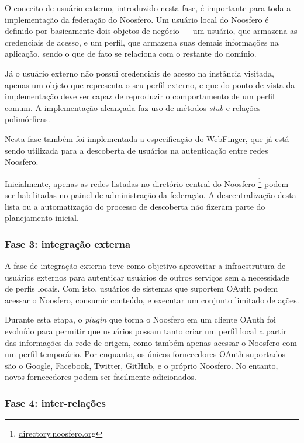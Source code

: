 O conceito de usuário externo, introduzido nesta fase, é importante para toda a
implementação da federação do Noosfero. Um usuário local do Noosfero é definido por
basicamente dois objetos de negócio --- um usuário, que armazena as credenciais de
acesso, e um perfil, que armazena suas demais informações na aplicação, sendo o que
de fato se relaciona com o restante do domínio.

Já o usuário externo não possui credenciais de acesso na instância visitada, apenas
um objeto que representa o seu perfil externo, e que do ponto de vista da
implementação deve ser capaz de reproduzir o comportamento de um perfil comum. A
implementação alcançada faz uso de métodos \textit{stub} e relações polimórficas.

Nesta fase também foi implementada a especificação do WebFinger, que já está sendo
utilizada para a descoberta de usuários na autenticação entre redes Noosfero.

Inicialmente, apenas as redes listadas no diretório central do Noosfero
\footnote{\url{directory.noosfero.org}} podem ser habilitadas no painel de
administração da federação. A descentralização desta lista ou a automatização do
processo de descoberta não fizeram parte do planejamento inicial.

\subsubsection{Fase 3: integração externa}

A fase de integração externa teve como objetivo aproveitar a infraestrutura de
usuários externos para autenticar usuários de outros serviços sem a necessidade de
perfis locais. Com isto, usuários de sistemas que suportem OAuth podem acessar o
Noosfero, consumir conteúdo, e executar um conjunto limitado de ações.

Durante esta etapa, o \textit{plugin} que torna o Noosfero em um cliente OAuth foi
evoluído para permitir que usuários possam tanto criar um perfil local a partir das
informações da rede de origem, como também apenas acessar o Noosfero com um perfil
temporário. Por enquanto, os únicos fornecedores OAuth suportados são o Google,
Facebook, Twitter, GitHub, e o próprio Noosfero. No entanto, novos fornecedores
podem ser facilmente adicionados.

\subsubsection{Fase 4: inter-relações}

